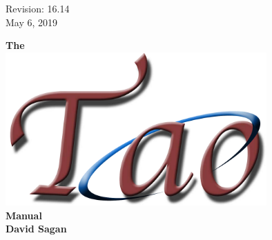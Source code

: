 \thispagestyle{empty}

\begin{flushright}
\large
Revision: 16.14 \\
May 6, 2019 \\
\end{flushright}

\vfill


{
\begin{center}
{\Huge \sf\bf The} \\
\vskip 0.1in
\includegraphics[width=10cm]{tao-logo.pdf} \\
\vskip 0.1in
{\Huge \sf\bf Manual} \\
\vskip 0.4in
{\huge \sf\bf David Sagan} \\
\end{center}
}

\vfill
\break
